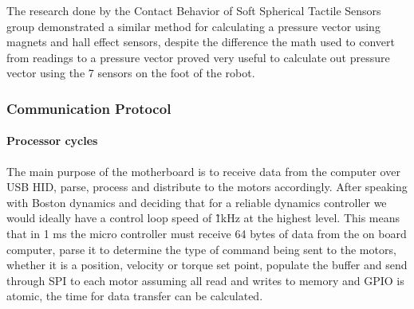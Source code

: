 The research done by the Contact Behavior of Soft Spherical Tactile Sensors\cite{youssefian2014contact} group demonstrated a similar method for calculating a pressure vector using magnets and hall effect sensors, despite the difference the math used to convert from readings to a pressure vector proved very useful to calculate out pressure vector using the 7 sensors on the foot of the robot. 
\subsubsection{Communication Protocol}
    \paragraph{Processor cycles}
        The main purpose of the motherboard is to receive data from the computer over USB HID, parse, process and distribute to the motors accordingly. After speaking with Boston dynamics and deciding that for a reliable dynamics controller we would ideally have a control loop speed of \~ 1kHz at the highest level. This means that in 1 ms the micro controller must receive 64 bytes of data from the on board computer, parse it to determine the type of command being sent to the motors, whether it is a position, velocity or torque set point, populate the buffer and send through SPI to each motor assuming all read and writes to memory and GPIO is atomic, the time for data transfer can be calculated. \newline
